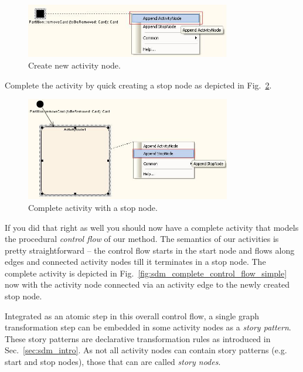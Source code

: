 \begin{figure}[htp]
\begin{center}
  \includegraphics[width=0.8\textwidth]{pics/sdmBilder/removeCard/sdm04RAW}
  \caption{Create new activity node.}  
  \label{fig:sdm_new_activity_node}
\end{center}
\end{figure}

Complete the activity by quick creating a stop node as depicted in
Fig.~\ref{fig:sdm_stop_node}.

\begin{figure}[htp]
\begin{center}
  \includegraphics[width=0.8\textwidth]{pics/sdmBilder/removeCard/sdm05RAW}
  \caption{Complete activity with a stop node.}  
  \label{fig:sdm_stop_node}
\end{center}
\end{figure}

If you did that right as well you should now have a complete activity that
models the procedural \emph{control flow} of our method.  The semantics of our
activities is pretty straightforward -- the control flow starts in the start
node and flows along edges and connected activity nodes till it terminates in a
stop node.  The complete activity is depicted in
Fig.~\ref{fig:sdm_complete_control_flow_simple} now with the activity node
connected via an activity edge to the newly created stop node.

Integrated as an atomic step in this overall control flow, a single graph
transformation step can be embedded in some activity nodes as a \emph{story
pattern}.  These story patterns are declarative transformation rules as introduced in
Sec.~\ref{sec:sdm_intro}.  As not all activity nodes can contain story
patterns (e.g. start and stop nodes), those that can are called \emph{story
nodes}. \clearpage


